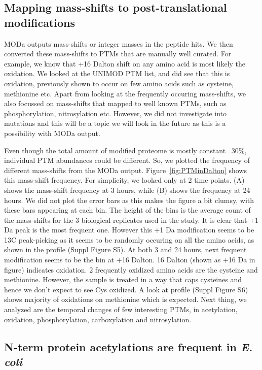 \documentclass[12pt]{article}
\begin{document}
\subsection{Mapping mass-shifts to post-translational modifications}
MODa outputs mass-shifts or integer masses in the peptide hits. We then converted these mass-shifts to PTMs that are manually well curated. For example, we know that +16 Dalton shift on any amino acid is most likely the oxidation. We looked at the UNIMOD PTM list, and did see that this is oxidation, previously shown to occur on few amino acids such as cysteine, methionine etc. Apart from looking at the frequently occuring mass-shifts, we also focussed on mass-shifts that mapped to well known PTMs, such as phosphorylation, nitrosylation etc. However, we did not investigate into mutations and this will be a topic we will look in the future as this is a possibility with MODa output.

Even though the total amount of modified proteome is mostly constant ~30\%, individual PTM abundances could be different. So, we plotted the frequency of different mass-shifts from the MODa output. Figure~\ref{fig:PTMinDalton} shows this mass-shift frequency. For simplicity, we looked only at 2 time points. (A) shows the mass-shift frequency at 3 hours, while (B) shows the frequency at 24 hours. We did not plot the error bars as this makes the figure a bit clumsy, with these bars appearing at each bin. The height of the bins is the average count of the mass-shifts for the 3 biological replicates used in the study. It is clear that +1 Da peak is the most frequent one. However this +1 Da modification seems to be 13C peak-picking as it seems to be randomly occuring on all the amino acids, as shown in the profile (Suppl Figure S5). At both 3 and 24 hours, next frequent modification seems to be the bin at +16 Dalton. 16 Dalton (shown as +16 Da in figure) indicates oxidation. 2 frequently oxidized amino acids are the cysteine and methionine. However, the sample is treated in a way that caps cysteines and hence we don't expect to see Cys oxidized. A look at profile (Suppl Figure S6) shows majority of oxidations on methionine which is expected. Next thing, we analyzed are the temporal changes of few interesting PTMs, in acetylation, oxidation, phosphorylation, carboxylation and nitrosylation.

\subsection{N-term protein acetylations are frequent in \emph{E. coli}}
 
\end{document}
